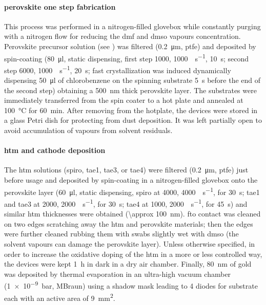 
		\paragraph{ perovskite one step fabrication}

		This process was performed in a nitrogen-filled glovebox
		while constantly purging with a nitrogen flow for reducing the \gls{dmf} and \gls{dmso} vapours concentration.
		Perovskite precursor solution (see ) was filtered (\SI{0.2}{\um}, \gls{ptfe})
		and deposited by spin-coating (\SI{80}{\ul}, static dispensing, first step \SI{1000}{\rpm}, \SI{1000}{\rpm\per\s}, \SI{10}{\s};
		second step \SI{6000}{\rpm}, \SI{1000}{\rpm\per\s}, \SI{20}{\s}; fast crystallization was induced dynamically
		dispensing \SI{50}{\ul} of chlorobenzene on the spinning substrate \SI{5}{\s} before the end of the second
		step) obtaining a \SI{500}{\nm} thick perovskite layer.
		The substrates were immediately transferred from
		the spin coater to a hot plate and annealed at \SI{100}{\celsius} for \SI{60}{\minute}.
		After removing from the hotplate, the devices were stored in a glass Petri dish for protecting from dust deposition.
		It was left partially open to avoid accumulation of vapours from solvent residuals.

		\paragraph{\Gls{htm} and cathode deposition}
		The \gls{htm} solutions (\gls{spiro}, \gls{tae1}, \gls{tae3}, or \gls{tae4}) were filtered (\SI{0.2}{\um}, \gls{ptfe}) just before usage and deposited by spin-coating in a nitrogen-filled glovebox
		onto the perovskite layer (\SI{60}{\ul}, static dispensing, \gls{spiro} at \SI{4000}{\rpm}, \SI{4000}{\rpm\per\s},
		for \SI{30}{\s}; \gls{tae1} and \gls{tae3} at \SI{2000}{\rpm}, \SI{2000}{\rpm\per\s}, for \SI{30}{\s}; \gls{tae4} at \SI{1000}{\rpm}, \SI{2000}{\rpm\per\s},
		for \SI{45}{\s}) and similar \gls{htm} thicknesses were obtained (\SI{\approx 100}{\nm}).
		\Gls{fto} contact was cleaned on two edges scratching away the \gls{htm} and perovskite materials; then the edges were further cleaned rubbing them with swabs slightly wet with \gls{dmso} (the solvent vapours can damage the perovskite layer).
		Unless otherwise specified, in order to increase the
		oxidative doping of the \gls{htm} in a more or less controlled way, the devices were kept \SI{1}{\hour} in dark in a dry air chamber.
		Finally, \SI{80}{\nm} of gold was deposited by thermal evaporation in an ultra-high vacuum chamber
		(\SI{1e-9}{\bar}, MBraun) using a shadow mask leading to 4 diodes for substrate each with an active area of
		\SI{9}{\mm\squared}.

